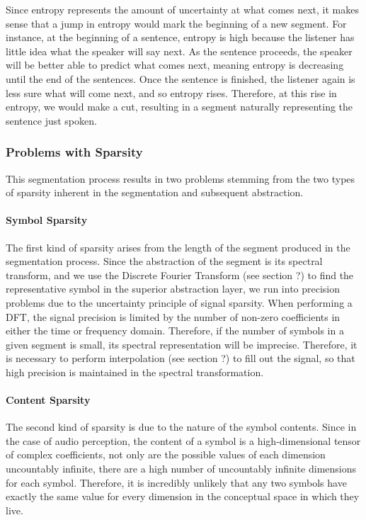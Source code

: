 \documentclass[runningheads]{llncs}
\begin{document}
Since entropy represents the amount of uncertainty at what comes next, it makes sense that a jump in entropy would mark the beginning of a new segment.  For instance, at the beginning of a sentence, entropy is high because the listener has little idea what the speaker will say next. As the sentence proceeds, the speaker will be better able to predict what comes next, meaning entropy is decreasing until the end of the sentences.  Once the sentence is finished, the listener again is less sure what will come next, and so entropy rises.  Therefore, at this rise in entropy, we would make a cut, resulting in a segment naturally representing the sentence just spoken.

\subsubsection{Problems with Sparsity}
This segmentation process results in two problems stemming from the two types of sparsity inherent in the segmentation and subsequent abstraction.

\paragraph{Symbol Sparsity}
The first kind of sparsity arises from the length of the segment produced in the segmentation process.  Since the abstraction of the segment is its spectral transform, and we use the Discrete Fourier Transform (see section ?) to find the representative symbol in the superior abstraction layer, we run into precision problems due to the uncertainty principle of signal sparsity.  When performing a DFT, the signal precision is limited by the number of non-zero coefficients in either the time or frequency domain.  Therefore, if the number of symbols in a given segment is small, its spectral representation will be imprecise.  Therefore, it is necessary to perform interpolation (see section ?) to fill out the signal, so that high precision is maintained in the spectral transformation.

\paragraph{Content Sparsity}
The second kind of sparsity is due to the nature of the symbol contents.  Since in the case of audio perception, the content of a symbol is a high-dimensional tensor of complex coefficients, not only are the possible values of each dimension uncountably infinite, there are a high number of uncountably infinite dimensions for each symbol.  Therefore, it is incredibly unlikely that any two symbols have exactly the same value for every dimension in the conceptual space in which they live.  
\end{document}
